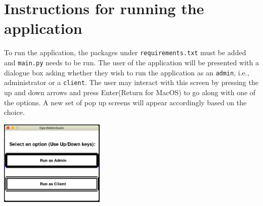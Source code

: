 \documentclass[fontsize=11pt]{article}
\begin{document}
    \section*{Instructions for running the application}
    To run the application, the packages under \texttt{requirements.txt} must be added and \texttt{main.py} needs to be run. The user of the application will be presented with a dialogue box asking whether they wish to run the application as an \texttt{admin}, i.e., administrator or a \texttt{client}. The user may interact with this screen by pressing the up and down arrows and press Enter(Return for MacOS) to go along with one of the options. A new set of pop up screens will appear accordingly based on the choice.\\
    \begin{center}
        \includegraphics[width = 5cm]{admin or client.png}\newline
    \end{center}
\end{document}
